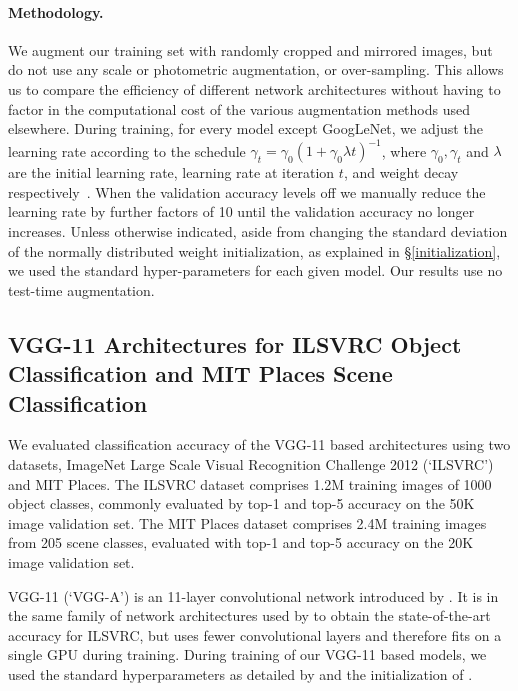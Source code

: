 \documentclass[thesis]{subfiles}
\begin{document}
    \paragraph{Methodology.} We augment our training set with randomly cropped and mirrored images, but do not use any scale or photometric augmentation, or over-sampling. This allows us to compare the efficiency of different network architectures without having to factor in the computational cost of the various augmentation methods used elsewhere. During training, for every model except GoogLeNet, we adjust the learning rate according to the schedule $\gamma_t = \gamma_0(1+\gamma_0\lambda t)^{-1}$, where $\gamma_0,\gamma_t$ and $\lambda$ are the initial learning rate, learning rate at iteration $t$, and weight decay respectively~\citep{Bottou2012sgdtricks}. When the validation accuracy levels off we manually reduce the learning rate by further factors of 10 until the validation accuracy no longer increases. Unless otherwise indicated, aside from changing the standard deviation of the normally distributed weight initialization, as explained in \S\ref{initialization}, we used the standard hyper-parameters for each given model. Our results use no test-time augmentation.  
    
    \subsection{VGG-11 Architectures for ILSVRC Object Classification and MIT Places Scene Classification}
    \label{vggresults}
    We evaluated classification accuracy of the VGG-11 based architectures using two datasets, ImageNet Large Scale Visual Recognition Challenge 2012 (`ILSVRC') and MIT Places. The ILSVRC dataset comprises 1.2M training images of 1000 object classes, commonly evaluated by top-1 and top-5 accuracy on the 50K image validation set. The MIT Places dataset comprises 2.4M training images from 205 scene classes, evaluated with top-1 and top-5 accuracy on the 20K image validation set.
    
    VGG-11 (`VGG-A') is an 11-layer convolutional network introduced by \citet{Simonyan2014verydeep}. It is in the same family of network architectures used by \citet{Simonyan2014verydeep,He2015delving} to obtain the state-of-the-art accuracy for ILSVRC, but uses fewer convolutional layers and therefore fits on a single GPU during training. During training of our VGG-11 based models, we used the standard hyperparameters as detailed by \citet{Simonyan2014verydeep} and the initialization of \citet{He2015delving}.
    
\end{document}
